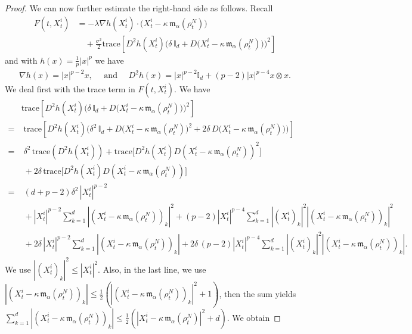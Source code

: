\documentclass[10pt,a4paper]{amsart}
\begin{document}
\begin{proof}
We can now further estimate the right-hand side as follows. Recall
\begin{align*}
    F(t,X^{i}_{t}) 
     &= -\lambda \nabla h(X^{i}_{t})\cdot \big(X^{i}_{t} - \kappa \, \mathfrak{m}_{\alpha}(\rho^{N}_{t})\big) \\
     &\quad+ \frac{\sigma^{2}}{2} \text{trace}\left[D^{2}h(X^{i}_{t}) \bigg( \delta\,\mathds{I}_{d} + D\big(X^{i}_{t} - \kappa\,\mathfrak{m}_{\alpha}(\rho^{N}_{t})\big) \bigg)^{2} \right]
\end{align*}
and with $h(x)=\frac{1}{p}|x|^{p}$ we have
\begin{align*}
    \nabla h(x) = |x|^{p-2}x, \quad \text{ and } \quad D^{2}h(x) = |x|^{p-2}\mathds{I}_{d} + (p-2)|x|^{p-4}x\otimes x.
\end{align*}
We deal first with the trace term in $F(t,X^{i}_{t})$. We have
\begin{align*}
    & %
    \text{trace}\left[D^{2}h(X^{i}_{t}) \bigg( \delta\,\mathds{I}_{d} + D\big(X^{i}_{t} - \kappa\,\mathfrak{m}_{\alpha}(\rho^{N}_{t})\big) \bigg)^{2} \right]\\
    =&\; \text{trace}\left[D^{2}h(X^{i}_{t}) \bigg( \delta^{2}\,\mathds{I}_{d} + D\big(X^{i}_{t} - \kappa\,\mathfrak{m}_{\alpha}(\rho^{N}_{t})\big)^{2} + 2\delta\, D\big(X^{i}_{t} - \kappa\,\mathfrak{m}_{\alpha}(\rho^{N}_{t})\big)\bigg) \right]\\
    =&\; \delta^{2}\,\text{trace}(D^{2}h(X^{i}_{t})) + \text{trace}\big[ D^{2}h(X^{i}_{t})D(X^{i}_{t} - \kappa\,\mathfrak{m}_{\alpha}(\rho^{N}_{t}))^{2}\big]\\
    &\;  + 2\delta\,\text{trace}\big[D^{2}h(X^{i}_{t})D(X^{i}_{t} - \kappa\,\mathfrak{m}_{\alpha}(\rho^{N}_{t}))\big]\\
    =&\;  (d+p-2)\delta^{2}\,|X^{i}_{t}|^{p-2} \\
    & \; +  |X^{i}_{t}|^{p-2} \sum\limits_{k=1}^{d} |(X^{i}_{t} - \kappa\,\mathfrak{m}_{\alpha}(\rho^{N}_{t}))_{k}|^{2} + (p-2) |X^{i}_{t}|^{p-4} \sum\limits_{k=1}^{d}|(X^{i}_{t})_{k}|^{2} |(X^{i}_{t} - \kappa\,\mathfrak{m}_{\alpha}(\rho^{N}_{t}) )_{k}|^{2}\\
    &\; + 2\delta\, |X^{i}_{t}|^{p-2} \sum\limits_{k=1}^{d}|(X^{i}_{t} - \kappa\, \mathfrak{m}_{\alpha}(\rho^{N}_{t}))_{k}| + 2\delta\,(p-2)|X^{i}_{t}|^{p-4} \sum\limits_{k=1}^{d} |(X^{i}_{t})_{k}|^{2} |(X^{i}_{t} - \kappa\,\mathfrak{m}_{\alpha}(\rho^{N}_{t}))_{k}|.
\end{align*}
We use $ |(X^{i}_{t})_{k}|^{2} \leq |X^{i}_{t}|^{2}$. Also, in the last line, we use $|(X^{i}_{t} - \kappa\, \mathfrak{m}_{\alpha}(\rho^{N}_{t}))_{k}| \leq \frac{1}{2}(|(X^{i}_{t} - \kappa\, \mathfrak{m}_{\alpha}(\rho^{N}_{t}))_{k}|^{2} + 1)$, then the sum yields $\sum\limits_{k=1}^{d}|(X^{i}_{t} - \kappa\, \mathfrak{m}_{\alpha}(\rho^{N}_{t}))_{k}| \leq \frac{1}{2}(|X^{i}_{t} - \kappa\, \mathfrak{m}_{\alpha}(\rho^{N}_{t})|^{2} + d)$.  We obtain

\end{proof}
\end{document}
